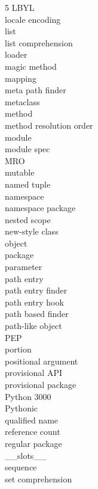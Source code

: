\documentclass [8pt] {extarticle}
\begin{document}
\begin {multicols} {5}
        LBYL \\
        locale encoding \\
        list \\
        list comprehension \\
        loader \\
        magic method \\
        mapping \\
        meta path finder \\
        metaclass \\
        method \\
        method resolution order \\
        module \\
        module spec \\
        MRO \\
        mutable \\
        named tuple \\
        namespace \\
        namespace package \\
        nested scope \\
        new-style class \\
        object \\
        package \\
        parameter \\
        path entry \\
        path entry finder \\
        path entry hook \\
        path based finder \\
        path-like object \\
        PEP \\
        portion \\
        positional argument \\
        provisional API \\
        provisional package \\
        Python 3000 \\
        Pythonic \\
        qualified name \\
        reference count \\
        regular package \\
        \_\_slots\_\_ \\
        sequence \\
        set comprehension \\

\end{multicols}
\end{document}
